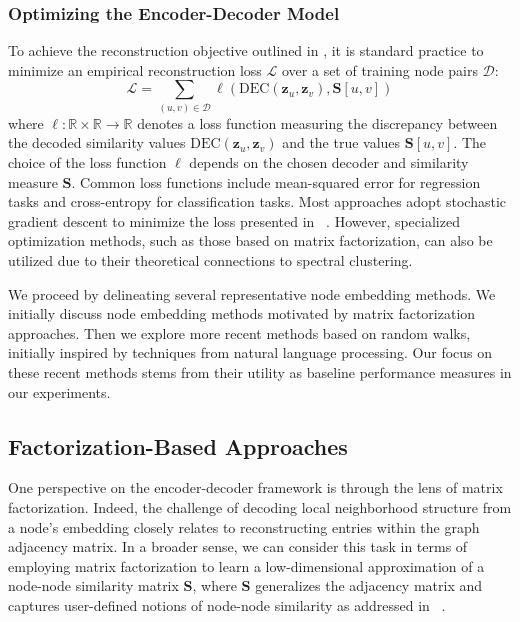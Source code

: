 \subsubsection{Optimizing the Encoder-Decoder Model}
To achieve the reconstruction objective outlined in , it is standard practice to minimize an empirical reconstruction loss $ \mathcal{L} $ over a set of training node pairs $ \mathcal{D} $:
\begin{equation}\label{eq:loss}
    \mathcal{L} = \sum_{(u,v)\in\mathcal{D}} \ell(\text{DEC}(\mathbf{z}_u, \mathbf{z}_v), \textbf{S}[u,v])
\end{equation}
where $ \ell: \mathbb{R}\times\mathbb{R}\to\mathbb{R} $ denotes a loss function measuring the discrepancy between the decoded similarity values $ \text{DEC}(\mathbf{z}_u, \mathbf{z}_v) $ and the true values $ \textbf{S}[u,v] $. The choice of the loss function $ \ell $ depends on the chosen decoder and similarity measure $ \textbf{S} $. Common loss functions include mean-squared error for regression tasks and cross-entropy for classification tasks. Most approaches adopt stochastic gradient descent to minimize the loss presented in ~\cite{Robbins1951stochasticApproximation}. However, specialized optimization methods, such as those based on matrix factorization, can also be utilized due to their theoretical connections to spectral clustering.

We proceed by delineating several representative node embedding methods. We initially discuss node embedding methods motivated by matrix factorization approaches. Then we explore more recent methods based on random walks, initially inspired by techniques from natural language processing. Our focus on these recent methods stems from their utility as baseline performance measures in our experiments.

\subsection{Factorization-Based Approaches}\label{sec:factorization}
One perspective on the encoder-decoder framework is through the lens of matrix factorization. Indeed, the challenge of decoding local neighborhood structure from a node's embedding closely relates to reconstructing entries within the graph adjacency matrix. In a broader sense, we can consider this task in terms of employing matrix factorization to learn a low-dimensional approximation of a node-node similarity matrix $ \mathbf{S} $, where $ \mathbf{S} $ generalizes the adjacency matrix and captures user-defined notions of node-node similarity as addressed in ~\cite{Belkin2001laplacianEigenmapsSpectralClusteringTechniquesEmbeddingClustering}\cite{Kruskal1964MultidimensionalScalingOptimizingGoodnessFitNonmetricHypothesis}.

